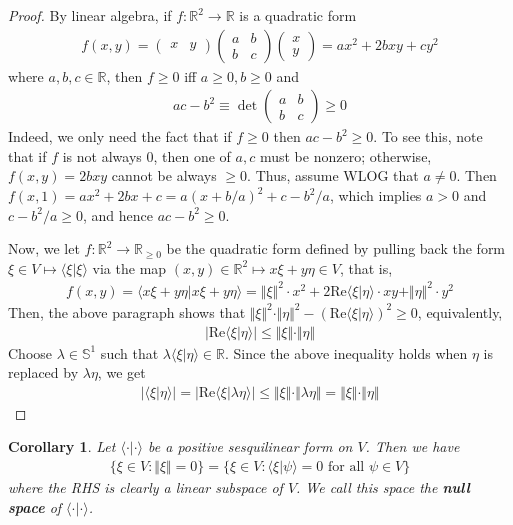 \documentclass[12pt,b5paper,notitlepage]{article}
\theoremstyle{definition}
\theoremstyle{plain}
\newtheorem{co}[df]{Corollary}
\newcommand{\bk}[1]{\langle {#1}\rangle}
\newcommand{\Rbb}{\mathbb R}
\newcommand{\Sbb}{{\mathbb S}}
\newcommand{\Real}{\mathrm{Re}}
\numberwithin{equation}{section}
\begin{document}
\begin{proof}
By linear algebra, if $f:\Rbb^2\rightarrow\Rbb$ is a quadratic form
\begin{align*}
f(x,y)=\begin{pmatrix}
x&y
\end{pmatrix}\begin{pmatrix}
a&b\\
b&c
\end{pmatrix}
\begin{pmatrix}
x\\
y
\end{pmatrix}
=ax^2+2bxy+cy^2
\end{align*}
where $a,b,c\in\Rbb$, then $f\geq0$ iff $a\geq0,b\geq0$ and
\begin{align*}
ac-b^2\equiv\det\begin{pmatrix}
a&b\\
b&c
\end{pmatrix}\geq0
\end{align*}
Indeed, we only need the fact that if $f\geq0$ then $ac-b^2\geq0$. To see this, note that if $f$ is not always $0$, then one of $a,c$ must be nonzero; otherwise, $f(x,y)=2bxy$ cannot be always $\geq0$. Thus, assume WLOG that $a\neq0$. Then $f(x,1)=ax^2+2bx+c=a(x+b/a)^2+c-b^2/a$, which implies $a>0$ and $c-b^2/a\geq0$, and hence $ac-b^2\geq0$.

Now, we let $f:\Rbb^2\rightarrow\Rbb_{\geq0}$ be the quadratic form defined by pulling back the form $\xi\in V\mapsto\bk{\xi|\xi}$ via the map $(x,y)\in\Rbb^2\mapsto x\xi+y\eta\in V$, that is,
\begin{align*}
f(x,y)=\bk{x\xi+y\eta|x\xi+y\eta}=\Vert \xi\Vert^2\cdot x^2+2\Real\bk{\xi|\eta}\cdot xy+\Vert \eta\Vert^2\cdot y^2
\end{align*}
Then, the above paragraph shows that $\Vert \xi\Vert^2\cdot\Vert \eta\Vert^2-(\Real\bk{\xi|\eta})^2\geq0$, equivalently,
\begin{align*}
|\Real\bk{\xi|\eta}|\leq \Vert \xi\Vert\cdot\Vert \eta\Vert
\end{align*}
Choose $\lambda\in\Sbb^1$ such that $\lambda\bk{\xi|\eta}\in\Rbb$. Since the above inequality holds when $\eta$ is replaced by $\lambda \eta$, we get
\begin{align*}
|\bk{\xi|\eta}|=|\Real\bk{\xi|\lambda \eta}|\leq\Vert \xi\Vert\cdot\Vert \lambda \eta\Vert=\Vert \xi\Vert\cdot\Vert \eta\Vert
\end{align*}
\end{proof}

\begin{co}\label{lb164}
Let $\bk{\cdot|\cdot}$ be a positive sesquilinear form on $V$. Then we have
\begin{align*}
\{\xi\in V:\Vert \xi\Vert=0\}=\{\xi\in V:\bk{\xi|\psi}=0\text{ for all }\psi\in V\}
\end{align*}
where the RHS is clearly a linear subspace of $V$. We call this space the \textbf{null space} of $\bk{\cdot|\cdot}$. 
\end{co}
\end{document}
